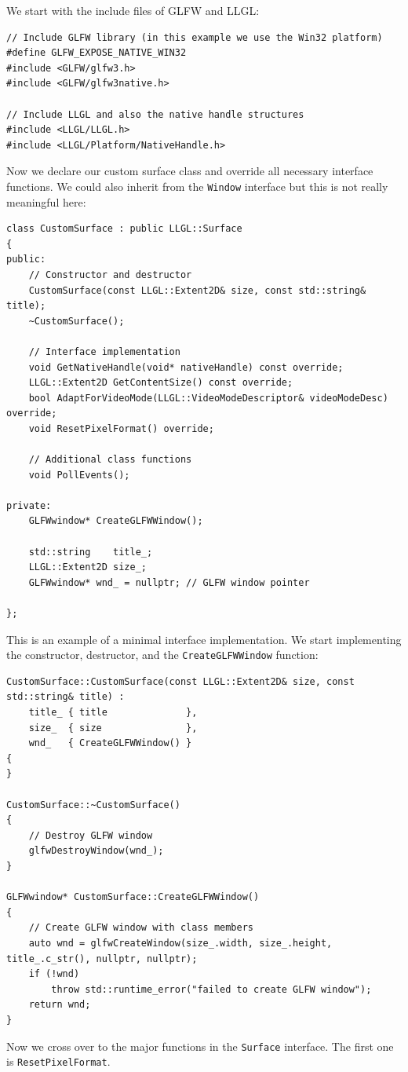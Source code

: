 \documentclass{article}
\begin{document}
We start with the include files of GLFW and LLGL:
\begin{lstlisting}
// Include GLFW library (in this example we use the Win32 platform)
#define GLFW_EXPOSE_NATIVE_WIN32
#include <GLFW/glfw3.h>
#include <GLFW/glfw3native.h>

// Include LLGL and also the native handle structures
#include <LLGL/LLGL.h>
#include <LLGL/Platform/NativeHandle.h>
\end{lstlisting}
Now we declare our custom surface class and override all necessary interface functions.
We could also inherit from the \texttt{Window} interface but this is not really meaningful here:
\begin{lstlisting}
class CustomSurface : public LLGL::Surface
{
public:
	// Constructor and destructor
	CustomSurface(const LLGL::Extent2D& size, const std::string& title);
	~CustomSurface();
	
	// Interface implementation
	void GetNativeHandle(void* nativeHandle) const override;
	LLGL::Extent2D GetContentSize() const override;
	bool AdaptForVideoMode(LLGL::VideoModeDescriptor& videoModeDesc) override;
	void ResetPixelFormat() override;
	
	// Additional class functions
	void PollEvents();
	
private:
	GLFWwindow* CreateGLFWWindow();
	
	std::string    title_;
	LLGL::Extent2D size_;
	GLFWwindow* wnd_ = nullptr; // GLFW window pointer
	
};
\end{lstlisting}
This is an example of a minimal interface implementation.
We start implementing the constructor, destructor, and the \texttt{CreateGLFWWindow} function:
\begin{lstlisting}
CustomSurface::CustomSurface(const LLGL::Extent2D& size, const std::string& title) :
	title_ { title              },
	size_  { size               },
	wnd_   { CreateGLFWWindow() }
{
}

CustomSurface::~CustomSurface()
{
	// Destroy GLFW window
	glfwDestroyWindow(wnd_);
}

GLFWwindow* CustomSurface::CreateGLFWWindow()
{
	// Create GLFW window with class members
	auto wnd = glfwCreateWindow(size_.width, size_.height, title_.c_str(), nullptr, nullptr);
	if (!wnd)
		throw std::runtime_error("failed to create GLFW window");
	return wnd;
}
\end{lstlisting}
Now we cross over to the major functions in the \texttt{Surface} interface. The first one is \texttt{ResetPixelFormat}.
\end{document}
